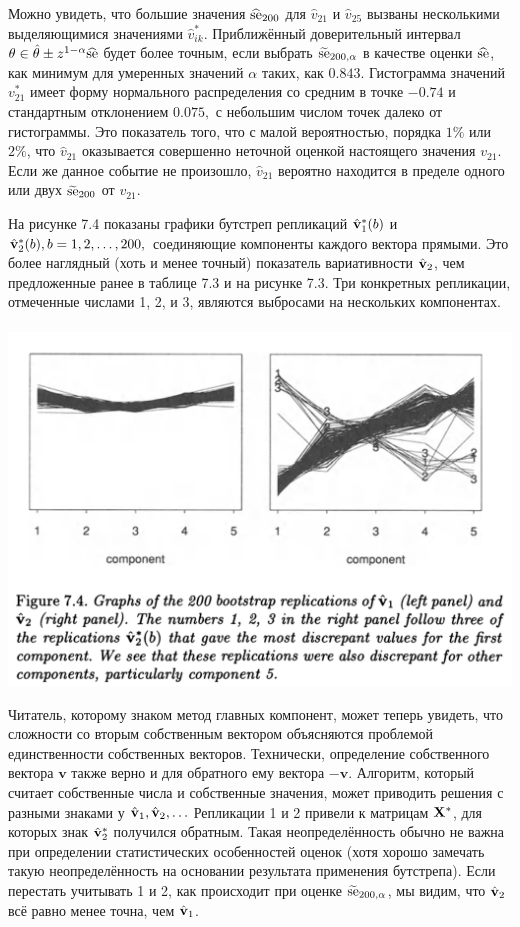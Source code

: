 Можно увидеть, что большие значения $\widehat{\text{se}}_{200}$ для $\hat v_{21}$ и $\hat v_{25}$ вызваны несколькими выделяющимися значениями $\hat v_{ik}^*$. Приближённый доверительный интервал $\theta \in \hat \theta \pm z^{1-\alpha} \widehat{\text{se}}$ будет более точным, если выбрать $\widetilde{\text{se}}_{200, \alpha}$ в качестве оценки $\widehat{\text{se}}$, как минимум для умеренных значений $\alpha$ таких, как $0.843$. Гистограмма значений  $v^*_{21}$ имеет форму нормального распределения со средним в точке $-0.74$ и стандартным отклонением $0.075,$ с небольшим числом точек далеко от гистограммы. Это показатель того, что с малой вероятностью, порядка $1\%$ или $2\%$, что $\hat v_{21}$ оказывается совершенно неточной оценкой настоящего значения $v_{21}$. Если же данное событие не произошло, $\hat v_{21}$ вероятно находится в пределе одного или двух $\widetilde{\text{se}}_{200}$ от $v_21$.

На рисунке 7.4 показаны графики бутстреп репликаций $\hat{\mathbf{v}}_1^*(b)$ и $\hat{\mathbf{v}}_2^*(b), b = 1,2,\ldots, 200,$ соединяющие компоненты каждого вектора прямыми. Это более наглядный (хоть и менее точный) показатель вариативности $\hat{\mathbf{v}}_2$, чем предложенные ранее в таблице 7.3 и на рисунке 7.3.
Три конкретных репликации, отмеченные числами 1, 2, и 3, являются выбросами на нескольких компонентах.
\\~\\
\noindent
\includegraphics[width=0.9\linewidth]{6/f74.png}
\newline
\setcounter{figure}{4}

Читатель, которому знаком метод главных компонент, может теперь увидеть, что сложности со вторым собственным вектором объясняются проблемой единственности собственных векторов.
Технически, определение собственного вектора $\mathbf v$ также верно и для обратного ему вектора $- \mathbf v$. Алгоритм, который считает собственные числа и собственные значения, может приводить решения с разными знаками у $\hat{\mathbf{v}}_1,\hat{\mathbf{v}}_2,\ldots$ Репликации 1 и 2 привели к матрицам $\mathbf X^*$, для которых знак $\hat{\mathbf{v}}_2^*$ получился обратным. Такая неопределённость обычно не важна при определении статистических особенностей оценок (хотя хорошо замечать такую неопределённость на основании результата применения бутстрепа). Если перестать учитывать 1 и 2, как происходит при оценке $\widetilde{\text{se}}_{200,\alpha}$, мы видим, что $\hat{\mathbf{v}}_2$ всё равно менее точна, чем $\hat{\mathbf{v}}_1$.





